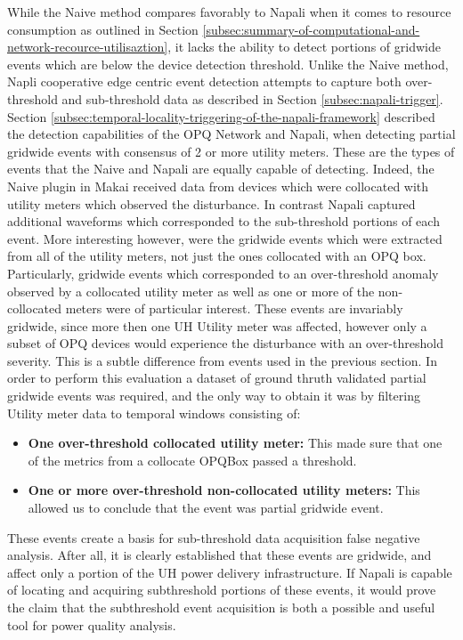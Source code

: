 While the Naive method compares favorably to Napali when it comes to resource consumption as outlined in Section \ref{subsec:summary-of-computational-and-network-recource-utilisaztion}, it lacks the ability to detect portions of gridwide events which are below the device detection threshold.
Unlike the Naive method, Napli cooperative edge centric event detection attempts to capture both over-threshold and sub-threshold data as described in Section \ref{subsec:napali-trigger}.
Section \ref{subsec:temporal-locality-triggering-of-the-napali-framework} described the detection capabilities of the OPQ Network and Napali, when detecting partial gridwide events with consensus of 2 or more utility meters.
These are the types of events that the Naive and Napali are equally capable of detecting.
Indeed, the Naive plugin in Makai received data from devices which were collocated with utility meters which observed the disturbance.
In contrast Napali  captured additional waveforms which corresponded to the sub-threshold portions of each event.
More interesting however, were the gridwide events which were extracted from all of the utility meters, not just the ones collocated with an OPQ box.
Particularly, gridwide events which corresponded to an over-threshold anomaly observed by a collocated utility meter as well as one or more of the non-collocated meters were of particular interest.
These events are invariably gridwide, since more then one UH Utility meter was affected, however only a subset of OPQ devices would experience the disturbance with an over-threshold severity.
This is a subtle difference from events used in the previous section.
In order to perform this evaluation a dataset of ground thruth validated partial gridwide events was required, and the only way to obtain it was by filtering Utility meter data to temporal windows consisting of:
\begin{itemize}
    \item \textbf{One over-threshold collocated utility meter:} This made sure that one of the metrics from a collocate OPQBox passed a threshold.
    \item \textbf{One or more over-threshold non-collocated utility meters:} This allowed us to conclude that the event was partial gridwide event.
\end{itemize}
These events create a basis for sub-threshold data acquisition false negative analysis.
After all, it is clearly established that these events are gridwide, and affect only a portion of the UH power delivery infrastructure.
If Napali is capable of locating and acquiring subthreshold portions of these events, it would prove the claim that the subthreshold event acquisition is both a possible and useful tool for power quality analysis.

